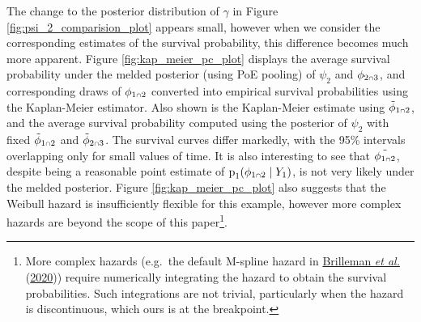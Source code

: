 \documentclass[
  10pt,
  a4paper,
]{article}
\let\Oldcap\cap
\renewcommand{\cap}{\mathrel{\mathsmaller{\Oldcap}}}
\newcommand{\pd}{\text{p}}
\begin{document}
The change to the posterior distribution of \(\gamma\) in Figure
\ref{fig:psi_2_comparision_plot} appears small, however when we consider
the corresponding estimates of the survival probability, this difference
becomes much more apparent. Figure \ref{fig:kap_meier_pc_plot} displays
the average survival probability under the melded posterior (using PoE
pooling) of \(\psi_{2}\) and \(\phi_{2 \cap 3}\), and corresponding
draws of \(\phi_{1 \cap 2}\) converted into empirical survival
probabilities using the Kaplan-Meier estimator. Also shown is the
Kaplan-Meier estimate using \(\tilde{\phi}_{1 \cap 2}\), and the average
survival probability computed using the posterior of \(\psi_{2}\) with
fixed \(\tilde{\phi}_{1 \cap 2}\) and \(\tilde{\phi}_{2 \cap 3}\). The
survival curves differ markedly, with the 95\% intervals overlapping
only for small values of time. It is also interesting to see that
\(\tilde{\phi_{1 \cap 2}}\), despite being a reasonable point estimate
of \(\pd_{1}(\phi_{1 \cap 2} \mid Y_{1})\), is not very likely under the
melded posterior. Figure \ref{fig:kap_meier_pc_plot} also suggests that
the Weibull hazard is insufficiently flexible for this example, however
more complex hazards are beyond the scope of this paper\footnote{More
  complex hazards (e.g.~the default M-spline hazard in
  \protect\hyperlink{ref-brilleman_bayesian_2020}{Brilleman \emph{et
  al.}} (\protect\hyperlink{ref-brilleman_bayesian_2020}{2020})) require
  numerically integrating the hazard to obtain the survival
  probabilities. Such integrations are not trivial, particularly when
  the hazard is discontinuous, which ours is at the breakpoint.}.
\end{document}

